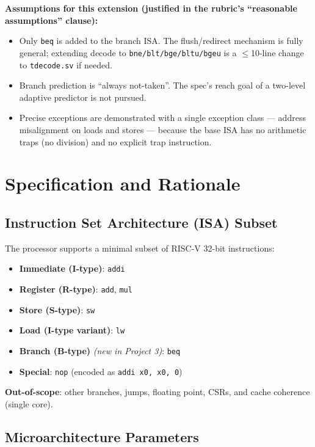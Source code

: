 \documentclass[11pt]{article}
\begin{document}
\noindent\textbf{Assumptions for this extension (justified in the rubric's ``reasonable
  assumptions'' clause):}
\begin{itemize}[noitemsep]
  \item Only \texttt{beq} is added to the branch ISA. The flush/redirect mechanism
        is fully general; extending decode to \texttt{bne/blt/bge/bltu/bgeu} is
        a $\leq$10-line change to \texttt{tdecode.sv} if needed.
  \item Branch prediction is ``always not-taken''. The spec's reach goal of a
        two-level adaptive predictor is not pursued.
  \item Precise exceptions are demonstrated with a single exception class ---
        address misalignment on loads and stores --- because the base ISA has no
        arithmetic traps (no division) and no explicit trap instruction.
\end{itemize}

\section{Specification and Rationale}

\subsection{Instruction Set Architecture (ISA) Subset}

The processor supports a minimal subset of RISC-V 32-bit instructions:

\begin{itemize}[noitemsep]
  \item \textbf{Immediate (I-type)}: \texttt{addi}
  \item \textbf{Register (R-type)}: \texttt{add}, \texttt{mul}
  \item \textbf{Store (S-type)}: \texttt{sw}
  \item \textbf{Load (I-type variant)}: \texttt{lw}
  \item \textbf{Branch (B-type)} \emph{(new in Project 3)}: \texttt{beq}
  \item \textbf{Special}: \texttt{nop} (encoded as \texttt{addi x0, x0, 0})
\end{itemize}

\textbf{Out-of-scope}: other branches, jumps, floating point, CSRs, and cache
coherence (single core).

\subsection{Microarchitecture Parameters}
\end{document}
